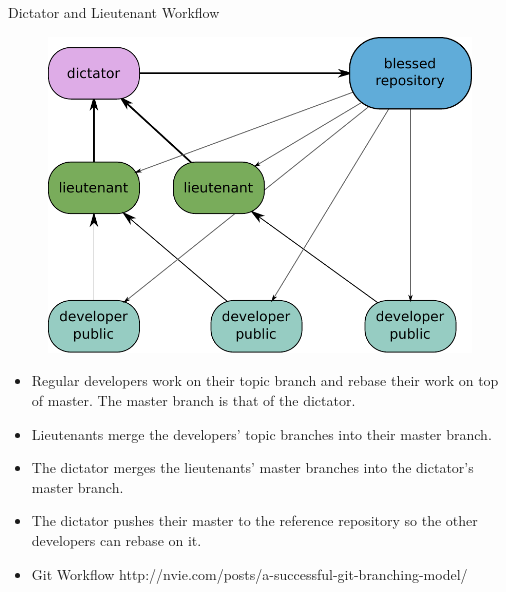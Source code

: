 \begin{frame}{Dictator and Lieutenant Workflow}
  \begin{figure} 
  \centering
    \includegraphics[scale=0.3]{images/dictator-and-lieteutnant-workflow.pdf}
  \end{figure}    
  \begin{itemize}
    \pause \item Regular developers work on their topic branch and rebase their work on top of master. The master branch is that of the dictator.
    \pause \item Lieutenants merge the developers’ topic branches into their master branch.
    \pause \item The dictator merges the lieutenants’ master branches into the dictator’s master branch.
    \pause \item The dictator pushes their master to the reference repository so the other developers can rebase on it.
  \end{itemize}
\end{frame}

\begin{frame}
  \begin{itemize}
    \item Git Workflow http://nvie.com/posts/a-successful-git-branching-model/%
  \end{itemize}
\end{frame}
